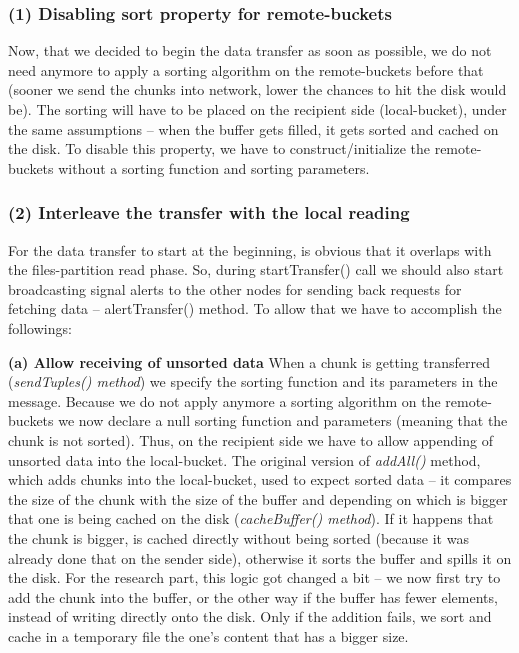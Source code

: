 % 
\subsubsection*{(1) Disabling sort property for remote-buckets}

Now, that we decided to begin the data transfer as soon as possible, we do not need anymore to apply a sorting algorithm on the remote-buckets before that (sooner we send the chunks into network, lower the chances to hit the disk would be). The sorting will have to be placed on the recipient side (local-bucket), under the same assumptions -- when the buffer gets filled, it gets sorted and cached on the disk. To disable this property, we have to construct/initialize the remote-buckets without a sorting function and sorting parameters.

% 
\subsubsection*{(2) Interleave the transfer with the local reading}

For the data transfer to start at the beginning, is obvious that it overlaps with the files-partition read phase. So, during startTransfer() call we should also start broadcasting signal alerts to the other nodes for sending back requests for fetching data -- alertTransfer() method. To allow that we have to accomplish the followings:

\textbf{(a) Allow receiving of unsorted data}
When a chunk is getting transferred (\textit{sendTuples() method}) we specify the sorting function and its parameters in the message. Because we do not apply anymore a sorting algorithm on the remote-buckets we now declare a null sorting function and parameters (meaning that the chunk is not sorted). Thus, on the recipient side we have to allow appending of unsorted data into the local-bucket. The original version of \textit{addAll()} method, which adds chunks into the local-bucket, used to expect sorted data -- it compares the size of the chunk with the size of the buffer and depending on which is bigger that one is being cached on the disk (\textit{cacheBuffer() method}). If it happens that the chunk is bigger, is cached directly without being sorted (because it was already done that on the sender side), otherwise it sorts the buffer and spills it on the disk. For the research part, this logic got changed a bit -- we now first try to add the chunk into the buffer, or the other way if the buffer has fewer elements, instead of writing directly onto the disk. Only if the addition fails, we sort and cache in a temporary file the one's content that has a bigger size.


